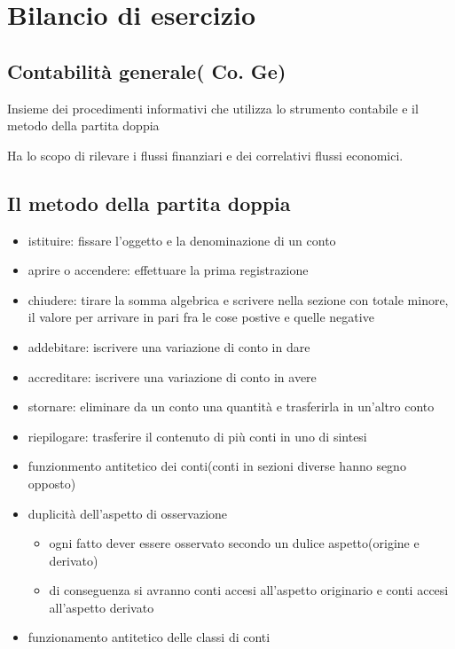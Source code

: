 \section{Bilancio di esercizio}
\subsection{Contabilità generale( Co. Ge)}

Insieme dei procedimenti informativi che utilizza lo
strumento contabile e il metodo della partita doppia

Ha lo scopo di rilevare i flussi finanziari e dei correlativi flussi economici.

\subsection{Il metodo della partita doppia}

\begin{itemize}
    \item istituire: fissare l'oggetto e la denominazione di un conto
    \item aprire o accendere: effettuare la prima registrazione
    \item chiudere: tirare la somma algebrica e scrivere nella sezione con totale minore, il valore per arrivare in pari fra le cose postive e quelle negative
    \item addebitare: iscrivere una variazione di conto in dare
    \item accreditare: iscrivere una variazione di conto in avere
    \item stornare: eliminare da un conto una quantità e trasferirla in un'altro conto
    \item riepilogare: trasferire il contenuto di più conti in uno di sintesi
    \item funzionmento antitetico dei conti(conti in sezioni diverse hanno segno opposto)
    \item duplicità dell'aspetto di osservazione
        \begin{itemize}
            \item ogni fatto dever essere osservato secondo un dulice aspetto(origine e derivato)
            \item di conseguenza si avranno conti accesi all'aspetto originario e conti accesi all'aspetto derivato
        \end{itemize}
    \item funzionamento antitetico delle classi di conti
\end{itemize}


